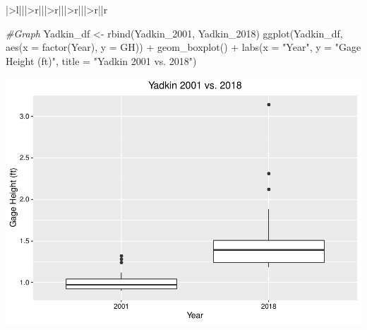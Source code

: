\documentclass[
  12pt,
]{article}
\newenvironment{Shaded}{\begin{snugshade}}{\end{snugshade}}
\newcommand{\AttributeTok}[1]{\textcolor[rgb]{0.77,0.63,0.00}{#1}}
\newcommand{\CommentTok}[1]{\textcolor[rgb]{0.56,0.35,0.01}{\textit{#1}}}
\newcommand{\DecValTok}[1]{\textcolor[rgb]{0.00,0.00,0.81}{#1}}
\newcommand{\DocumentationTok}[1]{\textcolor[rgb]{0.56,0.35,0.01}{\textbf{\textit{#1}}}}
\newcommand{\FunctionTok}[1]{\textcolor[rgb]{0.00,0.00,0.00}{#1}}
\newcommand{\NormalTok}[1]{#1}
\newcommand{\OtherTok}[1]{\textcolor[rgb]{0.56,0.35,0.01}{#1}}
\newcommand{\SpecialCharTok}[1]{\textcolor[rgb]{0.00,0.00,0.00}{#1}}
\newcommand{\StringTok}[1]{\textcolor[rgb]{0.31,0.60,0.02}{#1}}
\begin{document}
\begin{table}
\begin{tabular}[t]{|>{}l|||>{}r|||>{}r|||>{}r|||>{}r||r}
\begin{Shaded}
\begin{Highlighting}[]
\CommentTok{\#Graph}
\NormalTok{Yadkin\_df }\OtherTok{\textless{}{-}} \FunctionTok{rbind}\NormalTok{(Yadkin\_2001, Yadkin\_2018)}
\FunctionTok{ggplot}\NormalTok{(Yadkin\_df, }\FunctionTok{aes}\NormalTok{(}\AttributeTok{x =} \FunctionTok{factor}\NormalTok{(Year), }\AttributeTok{y =}\NormalTok{ GH)) }\SpecialCharTok{+} 
  \FunctionTok{geom\_boxplot}\NormalTok{() }\SpecialCharTok{+} 
  \FunctionTok{labs}\NormalTok{(}\AttributeTok{x =} \StringTok{"Year"}\NormalTok{, }\AttributeTok{y =} \StringTok{"Gage Height (ft)"}\NormalTok{, }\AttributeTok{title =} \StringTok{"Yadkin 2001 vs. 2018"}\NormalTok{)}
\end{Highlighting}
\end{Shaded}

\includegraphics{Project_Template_files/figure-latex/T-Test-3.pdf}

\begin{Shaded}
\end{Shaded}


\end{tabular}
\end{table}
\end{document}
